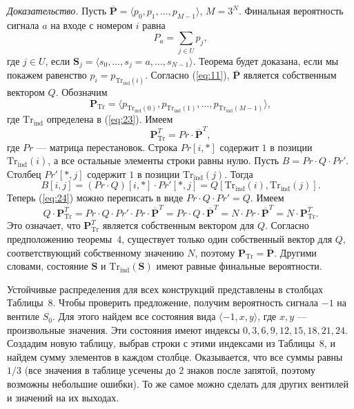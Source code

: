 \documentclass[a4paper,12pt]{article}
\begin{document}
\textit{Доказательство.} Пусть $\overline{\mathbf{P}} = \langle p_0, p_1, \ldots, p_{M-1}\rangle$, $M=3^N$. Финальная вероятность сигнала $a$ на входе с номером $i$ равна
\[
P_a = \sum_{j\in U} p_j,
\]
где $j\in U$, если $\mathbf{S}_j = \langle s_0, \ldots, s_j=a, \ldots, s_{N-1}\rangle$. Теорема будет доказана, если мы покажем равенство $p_i = p_{\mathrm{Tr}_{\mathrm{ind}}(i)}$. Согласно (\ref{eq:11}), $\overline{\mathbf{P}}$ является собственным вектором $Q$. Обозначим
\[
\mathbf{P}_{\mathrm{Tr}} = \langle p_{\mathrm{Tr}_{\mathrm{ind}}(0)}, p_{\mathrm{Tr}_{\mathrm{ind}}(1)}, \ldots, p_{\mathrm{Tr}_{\mathrm{ind}}(M-1)}\rangle,
\]
где $\mathrm{Tr}_{\mathrm{ind}}$ определена в (\ref{eq:23}). Имеем
\begin{equation}
\mathbf{P}_{\mathrm{Tr}}^T = Pr \cdot \overline{\mathbf{P}}^T,
\label{eq:29}
\end{equation}
где $Pr$ --- матрица перестановок. Строка $Pr[i,*]$ содержит $1$ в позиции $\mathrm{Tr}_{\mathrm{ind}}(i)$, а все остальные элементы строки равны нулю. Пусть $B = Pr\cdot Q\cdot Pr'$. Столбец $Pr'[*,j]$ содержит $1$ в позиции $\mathrm{Tr}_{\mathrm{ind}}(j)$. Тогда
\[
B[i,j] = (Pr\cdot Q)[i,*]\cdot Pr'[*,j] = Q[\mathrm{Tr}_{\mathrm{ind}}(i), \mathrm{Tr}_{\mathrm{ind}}(j)].
\]
Теперь (\ref{eq:24}) можно переписать в виде $Pr\cdot Q\cdot Pr' = Q$. Имеем
\[
Q\cdot \mathbf{P}_{\mathrm{Tr}}^T = Pr\cdot Q\cdot Pr' \cdot Pr\cdot \overline{\mathbf{P}}^T = Pr\cdot Q\cdot \overline{\mathbf{P}}^T = N\cdot Pr\cdot \overline{\mathbf{P}}^T = N\cdot \mathbf{P}_{\mathrm{Tr}}^T.
\]
Это означает, что $\mathbf{P}_{\mathrm{Tr}}^T$ является собственным вектором для $Q$. Согласно предположению теоремы~4, существует только один собственный вектор для $Q$, соответствующий собственному значению $N$, поэтому $\mathbf{P}_{\mathrm{Tr}} = \overline{\mathbf{P}}$. Другими словами, состояние $\mathbf{S}$ и $\mathrm{Tr}_{\mathrm{ind}}(\mathbf{S})$ имеют равные финальные вероятности.

Устойчивые распределения для всех конструкций представлены в столбцах Таблицы~8. Чтобы проверить предложение, получим вероятность сигнала $-1$ на вентиле $S_0$. Для этого найдем все состояния вида $\langle -1, x, y\rangle$, где $x, y$ --- произвольные значения. Эти состояния имеют индексы $0, 3, 6, 9, 12, 15, 18, 21, 24$. Создадим новую таблицу, выбрав строки с этими индексами из Таблицы~8, и найдем сумму элементов в каждом столбце. Оказывается, что все суммы равны $1/3$ (все значения в таблице усечены до $2$ знаков после запятой, поэтому возможны небольшие ошибки). То же самое можно сделать для других вентилей и значений на их выходах.
\end{document}
